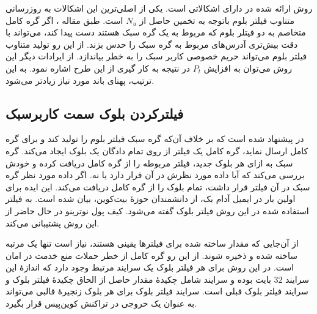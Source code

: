 روش ارائه شده در \cite{Kanemura2017} دارای اشکالاتی است. یکی از اصلی‌ترین این اشکالات به روزرسانی متناوب فیلتر بلوم باتوجه به تخمین حاصل از $N_u$  است. طبق مقاله \cite{Gervais2014}، اگر گره کامل متخاصم به دو فیتلر بلوم که مربوط به یک گره سبک هستند دست پیدا کند، می‌تواند با دقت بیش‌تری آدرس‌های مربوط به گره سبک را حدس بزند. از این رو تولید متناوب فیلتر بلوم می‌تواند حریم خصوصی کاربر سبک را به خطر بیاندازد.
از ایرادات دیگر این روش می‌توان به افزایش $P_t$ در نتیجه به کار گیری از این طرح اشاره نمود. به این ترتیب، پهنای باند مورد نیاز زیادتر می‌شود. 

\subsection{فیلترکردن بلوک سمت کاربرسبک}
\label{BIP157}
در \cite{Osuntokun2017} پیشنهاد شده است که بر خلاف آن‌که گره سبک فیلتر بلوم را تولید کند و برای گره کامل ارسال نماید، گره کامل یک فیلتر از روی تمام دادگان یک بلوک ایجاد می‌کند. گره سبک به ازای هر بلوک جدید، فیلتر مربوطه را از گره کامل دریافت کرده و خودش بررسی می‌کند که آیا داده مورد نظرش در آن قرار دارد یا نه. اگر داده مورد نظر گره سبک در آن فیلتر قرار داشت، تمام بلوک را از گره کامل دریافت می‌کند. این ایده برای اولین بار در ایمیل آدام بک، از دانشمندان حوزهٔ بیت‌کوین، بیان شده است\cite{Back2015}. به فیلتر استفاده شده در این روش 
فیلتر بلوک
 گفته می‌شود. کیف پول 
 نوترینو
در حال حاضر از این روش پشتیبانی می‌کند.

از آن‌جایی که مقدار ساخته شده برای فیلتر‌ها یقینی هستند، نیاز است تنها یک مرتبه ساخته شده و ذخیره شوند. از این رو گره کامل از خطر حملات منع خدمت در امان است. در این روش برای هر فیلتر بلوک یک سرایند مرتبط وجود دارد که اندازهٔ این سرایند $32$ بایت بوده و سرایند شامل چکیدهٔ مقدار حاصل از 
الحاق چکیدهٔ فیلتر بلوک و سرایند فیلتر بلوک قبلی است. سرایند فیلتر بلوک برای هر بلوک زنجیرهٔ قالبی می‌تواند به عنوان یک خروجی  در تراکنش کوین‌بِیس قرار بگیرد. 

